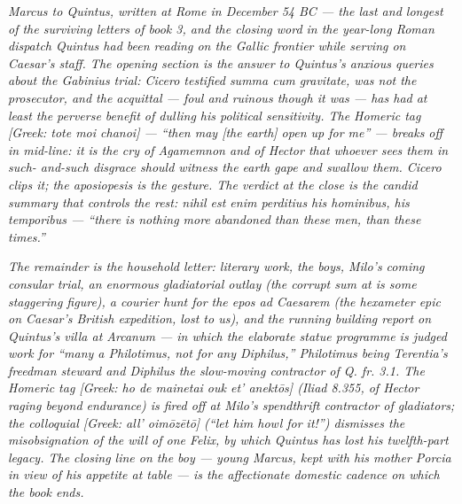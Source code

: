 
\textit{Marcus to Quintus, written at Rome in December 54
BC --- the last and longest of the surviving letters of book
3, and the closing word in the year-long Roman dispatch
Quintus had been reading on the Gallic frontier while serving
on Caesar's staff. The opening section is the answer to
Quintus's anxious queries about the Gabinius trial: Cicero
testified \textit{summa cum gravitate}, was not the
prosecutor, and the acquittal --- foul and ruinous though
it was --- has had at least the perverse benefit of dulling
his political sensitivity. The Homeric tag
\textit{[Greek: tote moi chanoi]} --- ``then may [the earth]
open up for me'' --- breaks off in mid-line: it is the cry
of Agamemnon and of Hector that whoever sees them in such-
and-such disgrace should witness the earth gape and swallow
them. Cicero clips it; the aposiopesis is the gesture. The
verdict at the close is the candid summary that controls
the rest: \textit{nihil est enim perditius his hominibus,
his temporibus} --- ``there is nothing more abandoned than
these men, than these times.''}

\textit{The remainder is the household letter: literary
work, the boys, Milo's coming consular trial, an enormous
gladiatorial outlay (the corrupt sum at  is
some staggering figure), a courier hunt for the
\textit{epos ad Caesarem} (the hexameter epic on Caesar's
British expedition, lost to us), and the running building
report on Quintus's villa at Arcanum --- in which the
elaborate statue programme is judged work for ``many a
Philotimus, not for any Diphilus,'' Philotimus being
Terentia's freedman steward and Diphilus the
slow-moving contractor of \textit{Q. fr.} 3.1. The
Homeric tag \textit{[Greek: ho de mainetai ouk et'
anekt\=os]} (Iliad 8.355, of Hector raging beyond
endurance) is fired off at Milo's spendthrift contractor
of gladiators; the colloquial \textit{[Greek: all'
oim\=oz\=et\=o]} (``let him howl for it!'') dismisses the
misobsignation of the will of one Felix, by which Quintus
has lost his twelfth-part legacy. The closing line on the
boy --- young Marcus, kept with his mother Porcia in
view of his appetite at table --- is the affectionate
domestic cadence on which the book ends.}
